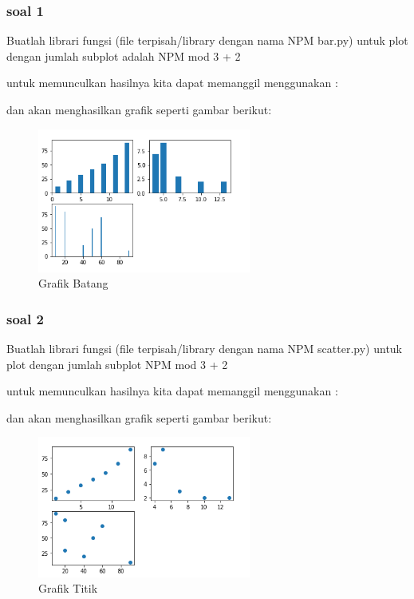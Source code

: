 \subsubsection{soal 1}
 Buatlah librari fungsi (ﬁle terpisah/library dengan nama NPM bar.py) untuk plot dengan jumlah subplot adalah NPM mod 3 + 2

untuk memunculkan hasilnya kita dapat memanggil menggunakan :


dan akan menghasilkan grafik seperti gambar berikut:
\begin{figure}[H]
\centering
\includegraphics[width=7cm]{figures/6/1174034/Praktek/p1.png}
\caption{Grafik Batang}
\label{Ichsan}
\end{figure}

\subsubsection{soal 2}
Buatlah librari fungsi (ﬁle terpisah/library dengan nama NPM scatter.py) untuk plot dengan jumlah subplot NPM mod 3 + 2

untuk memunculkan hasilnya kita dapat memanggil menggunakan :


dan akan menghasilkan grafik seperti gambar berikut:
\begin{figure}[H]
\centering
\includegraphics[width=7cm]{figures/6/1174034/Praktek/p2.png}
\caption{Grafik Titik}
\label{Ichsan}
\end{figure}


